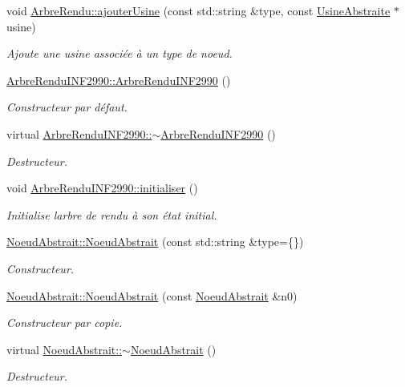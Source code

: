 \begin{DoxyCompactItemize}
void \hyperlink{group__inf2990_ga296a744837fb7b779fadf2e8c62e6577}{Arbre\+Rendu\+::ajouter\+Usine} (const std\+::string \&type, const \hyperlink{class_usine_abstraite}{Usine\+Abstraite} $\ast$usine)
\begin{DoxyCompactList}\small\item\em Ajoute une usine associée à un type de noeud. \end{DoxyCompactList}\item 
\hyperlink{group__inf2990_ga67528b7fa54e8ef8f96ef2e0bad06d2d}{Arbre\+Rendu\+I\+N\+F2990\+::\+Arbre\+Rendu\+I\+N\+F2990} ()
\begin{DoxyCompactList}\small\item\em Constructeur par défaut. \end{DoxyCompactList}\item 
virtual \hyperlink{group__inf2990_gaa67526b2fd719f6bcef7a4547bd25c7b}{Arbre\+Rendu\+I\+N\+F2990\+::$\sim$\+Arbre\+Rendu\+I\+N\+F2990} ()
\begin{DoxyCompactList}\small\item\em Destructeur. \end{DoxyCompactList}\item 
void \hyperlink{group__inf2990_ga678d89e1f12ae16ee7dcf6de3db637a3}{Arbre\+Rendu\+I\+N\+F2990\+::initialiser} ()
\begin{DoxyCompactList}\small\item\em Initialise l\textquotesingle{}arbre de rendu à son état initial. \end{DoxyCompactList}\item 
\hyperlink{group__inf2990_gad1eae42fe2bccef56f55b8a52726657f}{Noeud\+Abstrait\+::\+Noeud\+Abstrait} (const std\+::string \&type=\{\})
\begin{DoxyCompactList}\small\item\em Constructeur. \end{DoxyCompactList}\item 
\hyperlink{group__inf2990_gae7bea8d23c4dad60c334fc6806d08d01}{Noeud\+Abstrait\+::\+Noeud\+Abstrait} (const \hyperlink{class_noeud_abstrait}{Noeud\+Abstrait} \&n0)
\begin{DoxyCompactList}\small\item\em Constructeur par copie. \end{DoxyCompactList}\item 
virtual \hyperlink{group__inf2990_ga0ab3f7ab838e8349113da5074abcdc3a}{Noeud\+Abstrait\+::$\sim$\+Noeud\+Abstrait} ()
\begin{DoxyCompactList}\small\item\em Destructeur. \end{DoxyCompactList}\item 

\end{DoxyCompactItemize}
